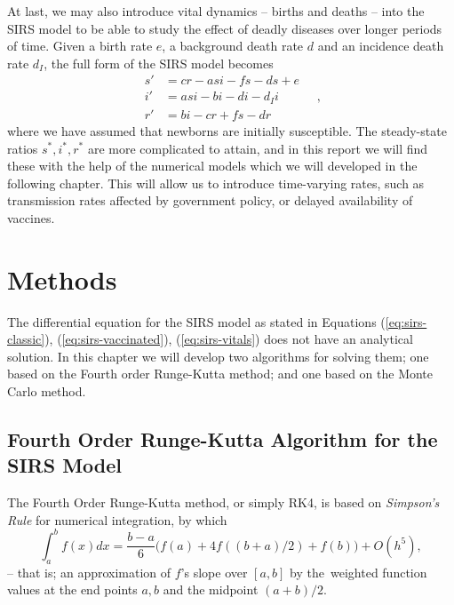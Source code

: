 \documentclass[]{article}
\begin{document}
At last, we may also introduce vital dynamics -- births and deaths -- into the SIRS model to be able to study the effect of deadly diseases over longer periods of time. Given a birth rate $e$, a background death rate $d$ and an incidence death rate $d_I$, the full form of the SIRS model becomes
\begin{equation} \label{eq:sirs-vitals}
\begin{aligned}
	s' &= cr - asi - fs - ds + e \\
	i' &= asi - bi - di -d_Ii\\
	r' &= bi - cr + fs - dr
\end{aligned} \quad ,
\end{equation}
where we have assumed that newborns are initially susceptible. The steady-state ratios $s^*, i^*, r^*$ are more complicated to attain, and in this report we will find these with the help of the numerical models which we will developed in the following chapter. This will allow us to introduce time-varying rates, such as transmission rates affected by government policy, or delayed availability of vaccines. 

\section{Methods} \label{sec:methods}

The differential equation for the SIRS model as stated in Equations (\ref{eq:sirs-classic}), (\ref{eq:sirs-vaccinated}), (\ref{eq:sirs-vitals}) does not have an analytical solution. In this chapter we will develop two algorithms for solving them; one based on the Fourth order Runge-Kutta method; and one based on the Monte Carlo method.

\subsection{Fourth Order Runge-Kutta Algorithm for the SIRS Model} \label{sec:runge-kutta}
The Fourth Order Runge-Kutta method, or simply RK4, is based on \textit{Simpson's Rule} for numerical integration, by which
\begin{equation} \label{eq:simpsons-rule}
	\int_{a}^{b} f(x) dx = \frac{b-a}{6} \big( f(a) + 4f((b+a)/2) + f(b) \big) + O(h^5),
\end{equation}
-- that is; an approximation of $f$'s slope over $[a,b]$ by the weighted function values at the end points $a,b$ and the midpoint $(a+b)/2$.
\end{document}

